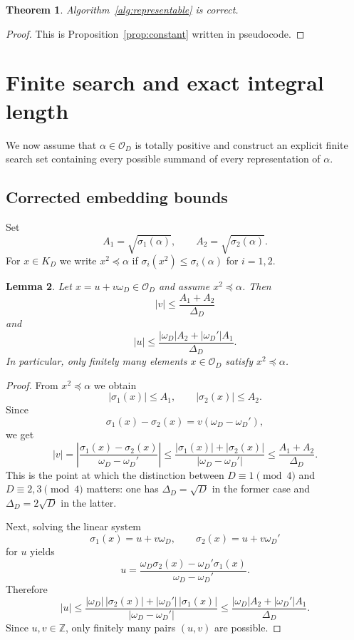 \documentclass[manuscript,screen]{acmart}
\renewcommand{\le}{\leqslant}
\theoremstyle{plain}
\newtheorem{theorem}{Theorem}[section]
\newtheorem{lemma}[theorem]{Lemma}
\theoremstyle{definition}
\theoremstyle{nonitalicremark}
\newcommand{\Z}{\mathbb{Z}}
\newcommand{\OD}{\mathcal{O}_D}
\newcommand{\wD}{\omega_D}
\newcommand{\wDp}{\omega_D'}
\newcommand{\sig}{\sigma}
\begin{document}
\begin{theorem}\label{thm:alg1}
Algorithm~\ref{alg:representable} is correct.
\end{theorem}

\begin{proof}
This is Proposition~\ref{prop:constant} written in pseudocode.
\end{proof}

\section{Finite search and exact integral length}\label{sec:search}

We now assume that $\alpha \in \OD$ is totally positive and construct an explicit finite search
set containing every possible summand of every representation of $\alpha$.

\subsection{Corrected embedding bounds}

Set
\[
A_1 = \sqrt{\sig_1(\alpha)}, \qquad A_2 = \sqrt{\sig_2(\alpha)}.
\]
For $x \in K_D$ we write $x^2 \preccurlyeq \alpha$ if
$\sig_i(x^2) \le \sig_i(\alpha)$ for $i=1,2$.

\begin{lemma}\label{lem:box}
Let $x=u+v\wD \in \OD$ and assume $x^2 \preccurlyeq \alpha$.
Then
\[
|v| \le \frac{A_1+A_2}{\Delta_D}
\]
and
\[
|u| \le \frac{|\wD|A_2 + |\wDp|A_1}{\Delta_D}.
\]
In particular, only finitely many elements $x\in\OD$ satisfy $x^2\preccurlyeq \alpha$.
\end{lemma}

\begin{proof}
From $x^2 \preccurlyeq \alpha$ we obtain
\[
|\sig_1(x)| \le A_1, \qquad |\sig_2(x)| \le A_2.
\]
Since
\[
\sig_1(x)-\sig_2(x)=v(\wD-\wDp),
\]
we get
\[
|v|=
\left|\frac{\sig_1(x)-\sig_2(x)}{\wD-\wDp}\right|
\le \frac{|\sig_1(x)|+|\sig_2(x)|}{|\wD-\wDp|}
\le \frac{A_1+A_2}{\Delta_D}.
\]
This is the point at which the distinction between $D\equiv 1 \pmod 4$ and
$D\equiv 2,3 \pmod 4$ matters: one has $\Delta_D=\sqrt D$ in the former case and
$\Delta_D=2\sqrt D$ in the latter.

Next, solving the linear system
\[
\sig_1(x)=u+v\wD, \qquad \sig_2(x)=u+v\wDp
\]
for $u$ yields
\[
u = \frac{\wD\sig_2(x)-\wDp\sig_1(x)}{\wD-\wDp}.
\]
Therefore
\[
|u| \le \frac{|\wD|\,|\sig_2(x)| + |\wDp|\,|\sig_1(x)|}{|\wD-\wDp|}
\le \frac{|\wD|A_2 + |\wDp|A_1}{\Delta_D}.
\]
Since $u,v\in\Z$, only finitely many pairs $(u,v)$ are possible.
\end{proof}
\end{document}
